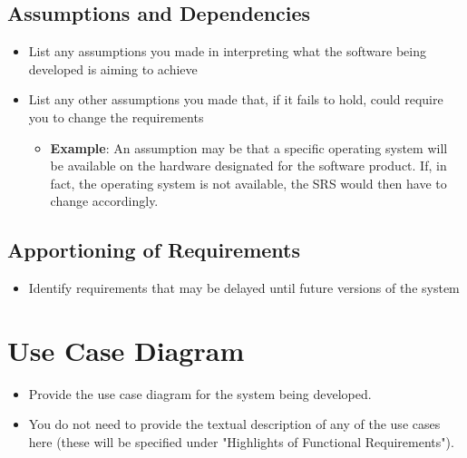 \documentclass[]{article}
\begin{document}
\subsection{Assumptions and Dependencies}
\label{sub:assumptions_and_dependencies}
\begin{itemize}
	\item List any assumptions you made in interpreting what the software being developed is aiming to achieve
	\item List any other assumptions you made that, if it fails to hold, could require you to change the requirements
	      \begin{itemize}
		      \item \textbf{Example}: An assumption may be that a specific operating system will be available on the hardware designated for the software product. If, in fact, the operating system is not available, the SRS would then have to change accordingly.
	      \end{itemize}
\end{itemize}

\subsection{Apportioning of Requirements}
\label{sub:apportioning_of_requirements}
\begin{itemize}
	\item Identify requirements that may be delayed until future versions of the system
\end{itemize}

\section{Use Case Diagram}
\label{sec:use_case_diagram}
\begin{itemize}
	\item Provide the use case diagram for the system being developed.
	\item You do not need to provide the textual description of any of the use cases here (these will be specified under "Highlights of Functional Requirements").
\end{itemize}
\end{document}
